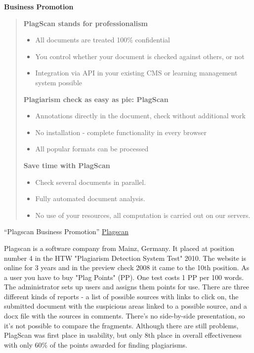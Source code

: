\textbf{Business Promotion}
\begin{quote}
\textbf{PlagScan stands for professionalism}
\begin{itemize}
\item All documents are treated 100\% confidential
\item    You control whether your document is checked against others, or not
\item    Integration via API in your existing CMS or learning management system possible
\end{itemize}
\textbf{Plagiarism check as easy as pie: PlagScan}
\begin{itemize}
\item    Annotations directly in the document, check without additional work
\item    No installation - complete functionality in every browser
 \item   All popular formats can be processed
\end{itemize}
\textbf{Save time with PlagScan}
\begin{itemize}
\item    Check several documents in parallel.
\item    Fully automated document analysis.
 \item   No use of your resources, all computation is carried out on our servers.
\end{itemize}

\end{quote}
\enquote{Plagscan Business Promotion}\citep{Plagscan Website} \href{http://www.plagscan.com}{Plagscan}

Plagscan is a software company from Mainz, Germany. It placed at position number 4 in the HTW "Plagiarism Detection System Test" 2010. The website is online for 3 years and in the preview check 2008 it came to the 10th position.
As a user you have to buy "Plag Points" (PP). One test costs 1 PP per 100 words. 
The administrator sets up users and assigns them points for use.
There are three different kinds of reports - a list of possible sources with links to click on, the submitted document with the suspicious areas linked to a possible source, and a docx file with the sources in comments.
There's no side-by-side presentation, so it's not possible to compare the fragments.
Although there are still problems, PlagScan was first place in usability, but only 8th place in overall effectiveness with only 60\% of the points awarded for finding plagiarisms.


